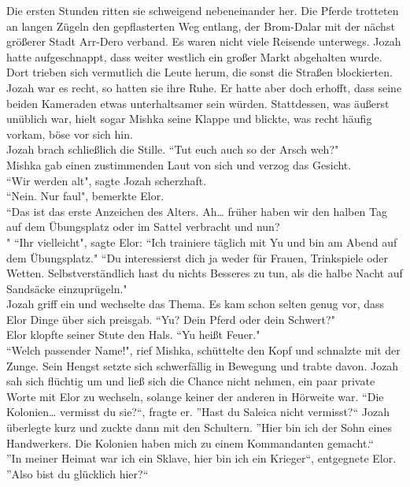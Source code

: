 Die ersten Stunden ritten sie schweigend nebeneinander her. Die Pferde trotteten an langen Zügeln 
den gepflasterten Weg entlang, der Brom-Dalar mit der nächst größerer Stadt Arr-Dero verband. Es 
waren nicht viele Reisende unterwegs. Jozah hatte aufgeschnappt, dass weiter westlich ein großer 
Markt abgehalten wurde. Dort trieben sich vermutlich die Leute herum, die sonst die Straßen 
blockierten. Jozah war es recht, so hatten sie ihre Ruhe. Er hatte aber doch erhofft, dass seine 
beiden Kameraden etwas unterhaltsamer sein würden. Stattdessen, was äußerst unüblich war, hielt 
sogar Mishka seine Klappe und blickte, was recht häufig vorkam, böse vor sich hin. \\
Jozah brach schließlich die Stille. ``Tut euch auch so der Arsch weh?"\\
Mishka gab einen zustimmenden Laut von sich und verzog das Gesicht. \\
``Wir werden alt", sagte Jozah scherzhaft.\\
``Nein. Nur faul", bemerkte Elor.\\
``Das ist das erste Anzeichen des Alters. Ah… früher haben wir den halben Tag auf dem Übungsplatz 
oder im Sattel verbracht und nun?\\"
``Ihr vielleicht", sagte Elor: ``Ich trainiere täglich mit Yu und bin am Abend auf dem Übungsplatz."
``Du interessierst dich ja weder für Frauen, Trinkspiele oder Wetten. Selbstverständlich hast du 
nichts Besseres zu tun, als die halbe Nacht auf Sandsäcke einzuprügeln."\\
Jozah griff ein und wechselte das Thema. Es kam schon selten genug vor, dass Elor Dinge über sich 
preisgab. ``Yu? Dein Pferd oder dein Schwert?"\\
Elor klopfte seiner Stute den Hals. ``Yu heißt Feuer."\\
``Welch passender Name!", rief Mishka, schüttelte den Kopf und schnalzte mit der Zunge. Sein Hengst 
setzte sich schwerfällig in Bewegung und trabte davon. Jozah sah sich flüchtig um und ließ sich die 
Chance nicht nehmen, ein paar private Worte mit Elor zu wechseln, solange keiner der anderen in 
Hörweite war.
``Die Kolonien… vermisst du sie?``, fragte er.
''Hast du Saleica nicht vermisst?``
Jozah überlegte kurz und zuckte dann mit den Schultern. ''Hier bin ich der Sohn eines Handwerkers. 
Die Kolonien haben mich zu einem Kommandanten gemacht.``\\
''In meiner Heimat war ich ein Sklave, hier bin ich ein Krieger``, entgegnete Elor.\\
''Also bist du glücklich hier?``\\
